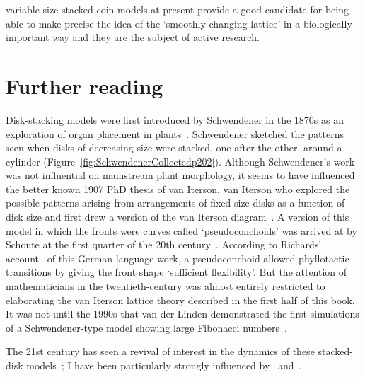 variable-size  stacked-coin models at present provide a good candidate for being able to make precise the idea of the `smoothly changing lattice' in a biologically important way and they are the subject of active research.

\section{Further reading}Disk-stacking models were first introduced by Schwendener in the 1870s as an exploration of organ placement in plants~\cite{schwendenerMechanischeTheorieBlattstellungen1878}.  Schwendener sketched the patterns seen when disks of decreasing size were stacked, one after the other, around a cylinder (Figure~\ref{fig:SchwendenerCollectedp202}).
Although Schwendener's work was not influential on mainstream plant morphology, it seems to have influenced the better known 1907 PhD thesis of van Iterson. van Iterson  who explored the possible patterns arising from arrangements of fixed-size disks as a function of disk size and first drew a version of the van Iterson diagram~\cite{vanitersonjrMathematischeUndMikroscopischAnatomische1907}. 
A version of this model in which the fronts were curves called `pseudoconchoids'  was  arrived at by Schoute at the first quarter of the 20th century~\cite{schouteUberPseudokonchoiden1913}. According to  Richards' account~\cite{richardsGeometryPhyllotaxisIts1948}  of this German-language work, a pseudoconchoid allowed phyllotactic transitions by giving the front shape `sufficient flexibility'. But 
the attention of mathematicians in the twentieth-century was almost entirely restricted to elaborating the van Iterson lattice theory described in the first half of this book.  It was not until the  1990s that van der Linden demonstrated the first simulations of a Schwendener-type model showing large Fibonacci numbers~\cite{vanderlindenCreatingPhyllotaxisDislodgement1990}.

The 21st century has seen a  revival of interest in the dynamics of these stacked-disk models~\cite{
	atelaDynamicalSystemPlant2002,
	atelaRhombicTilingsPrimordia2017,
	hottonPossibleActualPhyllotaxis2006,
	atelaGeometricDynamicEssence2011,adlerConsequencesContactPressure1977,godinPhyllotaxisGeometricCanalization2020};  I have been particularly strongly influenced by~\cite{goleFibonacciQuasisymmetricPhyllotaxis2016} and~\cite{goleConvergenceDiskStacking2020}. 	
